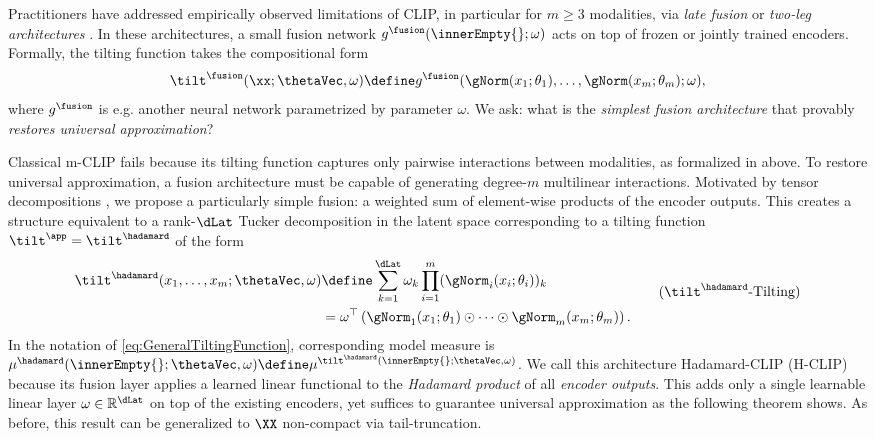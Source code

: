 \documentclass{article}
\begin{document}
Practitioners have addressed empirically observed limitations of CLIP, in
particular for $m \ge 3$ modalities, via \emph{late fusion} or
\emph{two-leg architectures} \citep{yuanSurveyMultimodalLearning2025}. In
these architectures, a small fusion network
$g^\fusion(\innerEmpty{};\omega)$ acts on top of frozen or jointly trained
encoders. Formally, the tilting function takes the compositional form
$$\tilt^\fusion(\xx; \thetaVec, \omega) \define g^{\fusion}(\gNorm(x_1;
 \theta_1), \ldots, \gNorm(x_m;\theta_m); \omega),$$ where $g^\fusion$ is
e.g. another neural network parametrized by parameter $\omega$. We ask:
what is the \emph{simplest fusion architecture} that provably
\emph{restores universal approximation}?

Classical m-CLIP fails because its tilting function captures only pairwise
interactions between modalities, as formalized in
 above. To restore universal
approximation, a fusion architecture must be capable of generating
degree-$m$ multilinear interactions. Motivated by tensor decompositions
\citep{ballardTensorDecompositionsData2025}, we propose a particularly
simple fusion: a weighted sum of element-wise products of the encoder
outputs. This creates a structure equivalent to a rank-$\dLat$ Tucker
decomposition in the latent space corresponding to a tilting function
$\tilt^\app = \tilt^\hadamard$ of the form
\begin{align}
 \begin{aligned}
  \tilt^\hadamard(x_1, \ldots, x_m;\thetaVec, \omega)
   & \define \sum_{k=1}^{\dLat} \omega_k
  \prod_{i=1}^{m} (\gNorm_i(x_i;\theta_i))_k \\
   & = \omega^\top
  \left(\gNorm_1(x_1;\theta_1) \odot \cdots \odot \gNorm_m(x_m;\theta_m)\right).
 \end{aligned}
 \tag{\ensuremath{\tilt^\hadamard}-Tilting}
 \label{eq:HadamardClipTiltingFunction}
\end{align}
In the notation of \eqref{eq:GeneralTiltingFunction}, corresponding model
measure is $\mu^{\hadamard}(\innerEmpty{};\thetaVec,\omega) \define
 \mu^{\tilt^\hadamard(\innerEmpty{};\thetaVec,\omega)}$.
We call this architecture Hadamard-CLIP (H-CLIP) because its fusion layer
 applies a learned linear functional to the \emph{Hadamard product} of all
 \emph{encoder outputs}.
This adds only a single learnable linear
layer $\omega \in \mathbb{R}^{\dLat}$ on top of the existing encoders,
yet suffices to guarantee universal approximation as the following
theorem shows. As before, this result can be generalized to
$\XX$ non-compact via tail-truncation.
\end{document}
